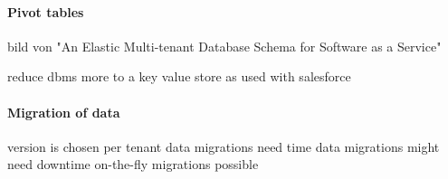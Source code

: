   \paragraph{Pivot tables}

  bild von "An Elastic Multi-tenant Database Schema for Software as a Service"

  reduce dbms more to a key value store
  as used with salesforce

\paragraph{Migration of data}
  version is chosen per tenant
  data migrations need time
  data migrations might need downtime
  on-the-fly migrations possible

